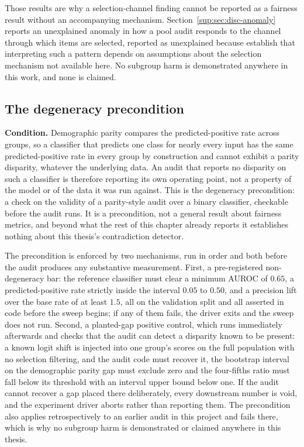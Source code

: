 Those results are why a selection-channel finding cannot be reported as a fairness result
without an accompanying mechanism. Section~\ref{sup:sec:disc-anomaly} reports an unexplained anomaly in
how a pool audit responds to the channel through which items are selected, reported as
unexplained because \citet{pfohl2025disaggregated} establish that interpreting such a pattern
depends on assumptions about the selection mechanism not available here. No subgroup harm is
demonstrated anywhere in this work, and none is claimed.


\subsection{The degeneracy precondition}

\textbf{Condition.} Demographic parity compares the predicted-positive rate across groups, so a
classifier that predicts one class for nearly every input has the same predicted-positive rate in
every group by construction and cannot exhibit a parity disparity, whatever the underlying data. An
audit that reports no disparity on such a classifier is therefore reporting its own operating point,
not a property of the model or of the data it was run against. This is the degeneracy precondition:
a check on the validity of a parity-style audit over a binary classifier, checkable before the audit
runs. It is a precondition, not a general result about fairness metrics, and beyond what the rest of
this chapter already reports it establishes nothing about this thesis's contradiction detector.

The precondition is enforced by two mechanisms, run in order and both before the audit produces any
substantive measurement. First, a pre-registered non-degeneracy bar: the reference classifier must
clear a minimum AUROC of $0.65$, a predicted-positive rate strictly inside the interval $0.05$ to
$0.50$, and a precision lift over the base rate of at least $1.5$, all on the validation split and
all asserted in code before the sweep begins; if any of them fails, the driver exits and the sweep
does not run. Second, a planted-gap positive control, which runs immediately afterwards and checks
that the audit can detect a disparity known to be present: a known logit shift is injected into one
group's scores on the full population with no selection filtering, and the audit code must recover
it, the bootstrap interval on the demographic parity gap must exclude zero and the four-fifths ratio
must fall below its threshold with an interval upper bound below one. If the audit cannot recover a
gap placed there deliberately, every downstream number is void, and the experiment driver aborts
rather than reporting them. The precondition also applies retrospectively to an earlier audit in
this project and fails there, which is why no subgroup harm is demonstrated or claimed anywhere in
this thesis.


